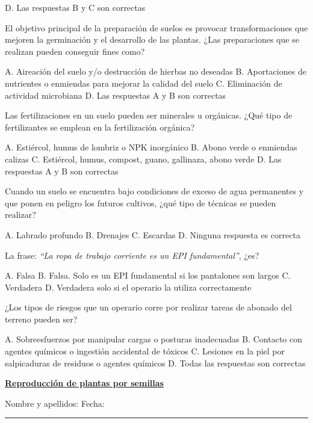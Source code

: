 \documentclass[11pt,answers]{exam}
\newcommand\titexam[1]{\centering%
\fbox{\parbox{\textwidth}{\huge \sffamily \textbf{#1}}}\normalsize \vspace{1em}}
\newcommand\materia[1]{%
\parbox{\textwidth}{ \Large \sffamily \textbf{\uline{#1}}}\vspace{1em}}
\newcommand\nombrefecha{%
Nombre y apellidos:\hrulefill
Fecha:\rule{3.5cm}{0.4pt}\vspace{0.5em}}
\begin{document}
{\begin{questions}
\begin{checkboxes}
    \CorrectChoice D. Las respuestas B y C son correctas
  \end{checkboxes}
\question El objetivo principal de la preparación de suelos es provocar transformaciones
  que mejoren la germinación y el desarrollo de las plantas. ¿Las preparaciones que se
  realizan pueden conseguir fines como?
  \begin{checkboxes}
    \choice A. Aireación del suelo y/o destrucción de hierbas no deseadas
    \choice B. Aportaciones de nutrientes o enmiendas para mejorar la calidad del suelo
    \choice C. Eliminación de actividad microbiana
    \CorrectChoice D. Las respuestas A y B son correctas
  \end{checkboxes}
\newpage
\question Las fertilizaciones en un suelo pueden ser minerales u orgánicas. ¿Qué tipo
  de fertilizantes se emplean en la fertilización orgánica?
  \begin{checkboxes}
    \choice A. Estiércol, humus de lombriz o NPK inorgánico
    \choice B. Abono verde  o enmiendas calizas
    \CorrectChoice C. Estiércol, humus, compost, guano, gallinaza, abono verde
    \choice D. Las respuestas A y B son correctas
  \end{checkboxes}


\question Cuando un suelo se encuentra bajo condiciones de exceso de agua
  permanentes y que ponen en peligro los futuros cultivos, ¿qué tipo de
  técnicas se pueden realizar?
  \begin{checkboxes}
    \choice A. Labrado profundo
    \CorrectChoice B. Drenajes
    \choice C. Escardas
    \choice D. Ninguna respuesta es correcta
  \end{checkboxes}

\question La frase: \emph{``La ropa de trabajo corriente es un EPI fundamental''}, ¿es?
  \begin{checkboxes}
    \CorrectChoice A. Falsa
    \choice B. Falsa. Solo es un EPI fundamental si los pantalones son largos
    \choice C. Verdadera
    \choice D. Verdadera solo si el operario la utiliza correctamente
  \end{checkboxes}

\question ¿Los tipos de riesgos que un operario corre por  realizar tareas de abonado del
  terreno pueden ser?
  \begin{checkboxes}
    \choice A. Sobreesfuerzos por manipular cargas o posturas inadecuadas
    \choice B. Contacto con agentes químicos o ingestión accidental de tóxicos
    \choice C. Lesiones en la piel por salpicaduras de residuos o agentes químicos
    \CorrectChoice D. Todas las respuestas son correctas
  \end{checkboxes}
\end{questions}
\titexam{MF1479\_2 Propagación de plantas en vivero}

\materia{Reproducción de plantas por semillas}

\nombrefecha

}
\end{document}
